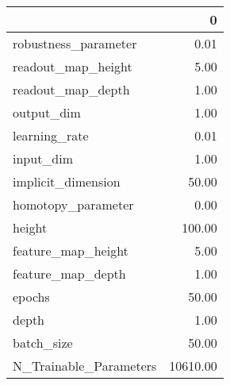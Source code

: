 \begin{tabular}{lr}
\toprule
{} &         0 \\
\midrule
robustness\_parameter   &      0.01 \\
readout\_map\_height     &      5.00 \\
readout\_map\_depth      &      1.00 \\
output\_dim             &      1.00 \\
learning\_rate          &      0.01 \\
input\_dim              &      1.00 \\
implicit\_dimension     &     50.00 \\
homotopy\_parameter     &      0.00 \\
height                 &    100.00 \\
feature\_map\_height     &      5.00 \\
feature\_map\_depth      &      1.00 \\
epochs                 &     50.00 \\
depth                  &      1.00 \\
batch\_size             &     50.00 \\
N\_Trainable\_Parameters &  10610.00 \\
\bottomrule
\end{tabular}

